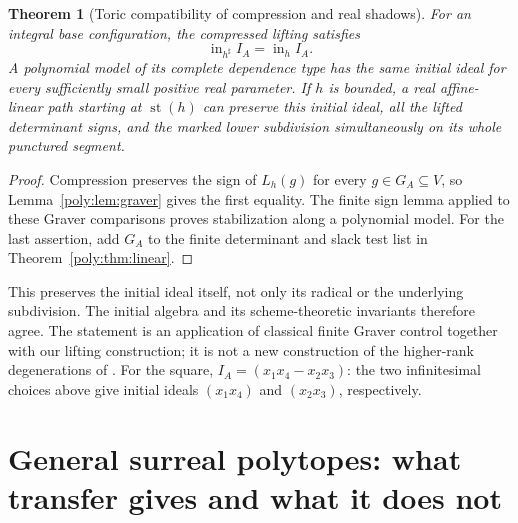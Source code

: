\documentclass[11pt,a4paper]{article}
\numberwithin{equation}{section}
\newtheorem{theorem}{Theorem}[section]
\theoremstyle{plain}
\newcommand{\st}{\operatorname{st}}
\begin{document}
\begin{theorem}[Toric compatibility of compression and real shadows]
\label{poly:thm:toric}
For an integral base configuration, the compressed lifting satisfies
\[
 \operatorname{in}_{h^\sharp}I_A=\operatorname{in}_h I_A.
\]
A polynomial model of its complete dependence type has the same initial
ideal for every sufficiently small positive real parameter. If $h$ is
bounded, a real affine-linear path starting at $\st(h)$ can preserve this
initial ideal, all the lifted determinant signs, and the marked lower
subdivision simultaneously on its whole punctured segment.
\end{theorem}
\begin{proof}
Compression preserves the sign of $L_h(g)$ for every $g\in G_A\subseteq V$,
so Lemma~\ref{poly:lem:graver} gives the first equality. The finite sign lemma
applied to these Graver comparisons proves stabilization along a polynomial
model. For the last assertion, add $G_A$ to the finite determinant and
slack test list in Theorem~\ref{poly:thm:linear}.
\end{proof}

This preserves the initial ideal itself, not only its radical or the
underlying subdivision. The initial algebra and its scheme-theoretic
invariants therefore agree. The statement is an application of classical
finite Graver control together with our lifting construction; it is not a
new construction of the higher-rank degenerations of \cite{fs:CCFL}.
For the square, $I_A=(x_1x_4-x_2x_3)$: the two infinitesimal choices above
give initial ideals $(x_1x_4)$ and $(x_2x_3)$, respectively.

\section{General surreal polytopes: what transfer gives and what it does not}
\label{poly:sec:general}\label{poly:ts:sec:transfer}
\end{document}

